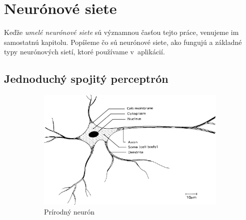 
\chapter{Neurónové siete}\label{chap:neuralnet}

Keďže \textit{umelé neurónové siete} sú významnou časťou tejto práce, venujeme im samostatnú kapitolu. Popíšeme čo sú neurónové siete, ako fungujú a základné typy neurónových sietí, ktoré používame v~aplikácií.
\bigskip

\section{Jednoduchý spojitý perceptrón}

\begin{figure}[hp]
  \begin{center}
    \begin{subfigure}[b]{0.6\textwidth}
      \centering
      \includegraphics[width=\textwidth]{images/bio_neuron}
      \caption{Prírodný neurón}
      \label{fig:bio_neuron}
    \end{subfigure}
    \begin{subfigure}[b]{0.3\textwidth}
      \centering

\end{subfigure}
\end{center}
\end{figure}
